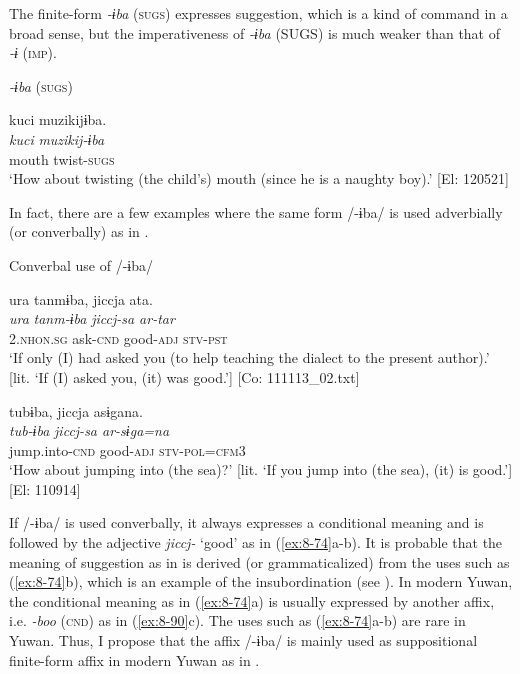   The finite-form \textit{-ɨba} (\textsc{sugs}) expresses suggestion, which is a kind of command in a broad sense, but the imperativeness of \textit{-ɨba} (SUGS) is much weaker than that of \textit{-ɨ} (\textsc{imp}).

\ea\label{ex:8-73}
  \textit{-ɨba} (\textsc{sugs})

  {\TM}
\glll  kuci  muzikijɨba.\\
\textit{kuci}  \textit{muzikij-ɨba}\\

    mouth  twist-\textsc{sugs}\\
\glt ‘How about twisting (the child’s) mouth (since he is a naughty boy).’ [El: 120521]
\z
\z

In fact, there are a few examples where the same form /-ɨba/ is used adverbially (or converbally) as in .

\ea\label{ex:8-74}
  Converbal use of /-ɨba/

\ea
{\TM}
\glll  ura  tanmɨba,  jiccja  ata.\\
\textit{ura}  \textit{tanm-ɨba}  \textit{jiccj-sa  ar-tar}\\
2.\textsc{nhon}.\textsc{sg}  ask-\textsc{cnd}  good-\textsc{adj}  \textsc{stv}-\textsc{pst}\\
\glt ‘If only (I) had asked you (to help teaching the dialect to the present author).’ [lit. ‘If (I) asked you, (it) was good.’]       [Co: 111113\_02.txt]

\ex
{\TM}
\glll  tubɨba,  jiccja  asɨgana.\\
\textit{tub-ɨba}  \textit{jiccj-sa  ar-sɨga=na}\\
jump.into-\textsc{cnd}  good-\textsc{adj}  \textsc{stv}-\textsc{pol}=\textsc{cfm3}\\
\glt ‘How about jumping into (the sea)?’ [lit. ‘If you jump into (the sea), (it) is good.’]       [El: 110914]
\z
\z

If /-ɨba/ is used converbally, it always expresses a conditional meaning and is followed by the adjective \textit{jiccj-} ‘good’ as in (\ref{ex:8-74}a-b). It is probable that the meaning of suggestion as in  is derived (or grammaticalized) from the uses such as (\ref{ex:8-74}b), which is an example of the insubordination (see ). In modern Yuwan, the conditional meaning as in (\ref{ex:8-74}a) is usually expressed by another affix, i.e. \textit{-boo} (\textsc{cnd}) as in (\ref{ex:8-90}c). The uses such as (\ref{ex:8-74}a-b) are rare in Yuwan. Thus, I propose that the affix /-ɨba/ is mainly used as suppositional finite-form affix in modern Yuwan as in .

